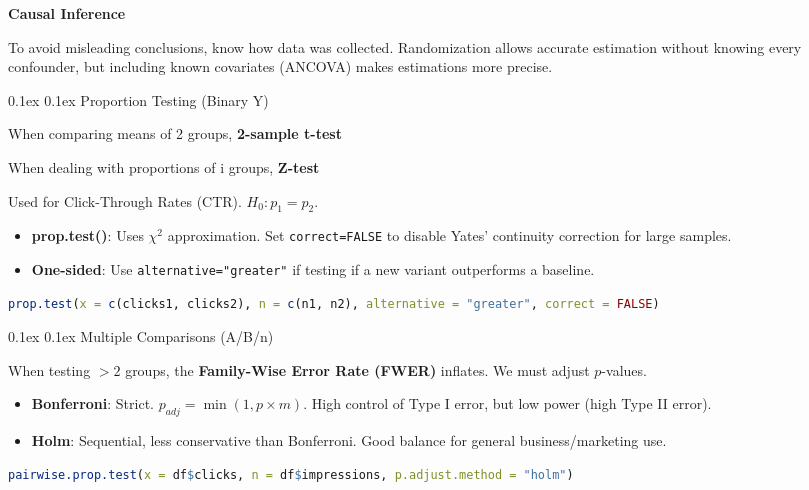 \documentclass[8pt,landscape]{article}
\makeatletter
\renewcommand{\section}{\@startsection{section}{2}{0pt}%
    {0.1ex}%
    {0.1ex}%
    {\fontsize{8}{9}\bfseries\color{red}}} %
\renewcommand{\subsection}{\@startsection{subsection}{2}{0pt}%
    {0.1ex}%
    {0.1ex}%
    {\fontsize{8}{9}\bfseries\color{blue}}} %
\newcommand{\code}[1]{\textcolor{myred}{\texttt{#1}}}
\newcommand{\smalltext}[1]{
  {\fontsize{8}{9}\selectfont\sloppy #1\par}
}
\makeatother
\begin{document}
\begin{multicols}{3}
\textbf{Causal Inference}
\smalltext{
To avoid misleading conclusions, know how data was collected. Randomization allows accurate estimation without knowing every confounder, but including known covariates (ANCOVA) makes estimations more precise.
}

\section{Proportion Testing (Binary Y)}
\smalltext{
When comparing means of 2 groups, \textbf{2-sample t-test}

When dealing with proportions of i groups, \textbf{Z-test}

Used for Click-Through Rates (CTR). $H_0: p_1 = p_2$.
\begin{itemize}
    \item \textbf{prop.test()}: Uses $\chi^2$ approximation. Set \code{correct=FALSE} to disable Yates' continuity correction for large samples.
    \item \textbf{One-sided}: Use \code{alternative="greater"} if testing if a new variant outperforms a baseline.
\end{itemize}
}
\begin{lstlisting}[language=R]
prop.test(x = c(clicks1, clicks2), n = c(n1, n2), alternative = "greater", correct = FALSE)
\end{lstlisting}

\subsection{Multiple Comparisons (A/B/n)}
\smalltext{
When testing $>2$ groups, the \textbf{Family-Wise Error Rate (FWER)} inflates. We must adjust $p$-values.
\begin{itemize}
    \item \textbf{Bonferroni}: Strict. $p_{adj} = \min(1, p \times m)$. High control of Type I error, but low power (high Type II error).
    \item \textbf{Holm}: Sequential, less conservative than Bonferroni. Good balance for general business/marketing use.
\end{itemize}
}
\begin{lstlisting}[language=R]
pairwise.prop.test(x = df$clicks, n = df$impressions, p.adjust.method = "holm")
\end{lstlisting}


\end{multicols}
\end{document}
